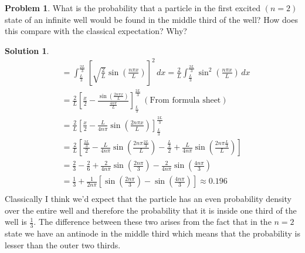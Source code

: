 \documentclass[10pt]{article}
\theoremstyle{definition}
\newtheorem{problem}{Problem}
\newtheorem{soln}{Solution}
\begin{document}
\begin{problem}
What is the probability that a particle in the first excited $(n=2)$ state of an infinite well would be
found in the middle third of the well? How does this compare with the classical expectation? Why?
\end{problem}
\begin{soln}
  \begin{align*}
     & = \int_{\frac{L}{3}}^{\frac{2L}{3}}\left[\sqrt{\frac{2}{L}}\sin\left(\frac{n\pi x}{L}\right)\right]^2\,dx= \frac{2}{L}\int_{\frac{L}{3}}^{\frac{2L}{3}}\sin^2\left(\frac{n\pi x}{L}\right)\,dx  \\
     & = \frac{2}{L}\left[\frac{x}{2}-\frac{\sin\left(\frac{2n\pi x}{L}\right)}{\frac{4n\pi}{L}}\right]_{\frac{L}{3}}^{\frac{2L}{3}}\,(\text{From formula sheet})                                      \\
     & = \frac{2}{L}\left[\frac{x}{2}-\frac{L}{4n\pi}\sin\left(\frac{2n\pi x}{L}\right)\right]_{\frac{L}{3}}^{\frac{2L}{3}}                                                                            \\
     & = \frac{2}{L}\left[\frac{\frac{2L}{3}}{2}-\frac{L}{4n\pi}\sin\left(\frac{2n\pi \frac{2L}{3}}{L}\right)-\frac{\frac{L}{3}}{2}+\frac{L}{4n\pi}\sin\left(\frac{2n\pi \frac{L}{3}}{L}\right)\right] \\
     & = \frac{2}{3}-\frac{2}{6}+\frac{2}{4n\pi}\sin\left(\frac{2n\pi}{3}\right)-\frac{2}{4n\pi}\sin\left(\frac{4n\pi}{3}\right)                                                                       \\
     & = \frac{1}{3}+\frac{1}{2n\pi}\left[\sin\left(\frac{2n\pi}{3}\right)-\sin\left(\frac{4n\pi}{3}\right)\right]\approx0.196                                                                         \\
  \end{align*}
  Classically I think we'd expect that the particle has an even probability density over the entire well and therefore the probability that it is inside one third of the well is $\frac{1}{3}$.
  The difference between these two arises from the fact that in the $n=2$ state we have an antinode in the middle third which means that the probability is lesser than the outer two thirds.
\end{soln}
\end{document}
